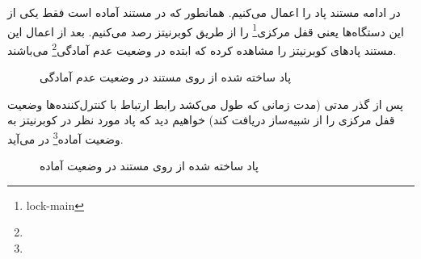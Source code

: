 {\begin{figure}[H]
        \label{fig:dash_devices}
    \end{figure}
    در ادامه مستند پاد را اعمال می‌کنیم. همانطور که در مستند آماده است فقط یکی از این دستگاه‌ها یعنی قفل مرکزی\footnote{lock-main} را از طریق کوبرنیتز رصد می‌کنیم. بعد از اعمال این مستند پاد‌های کوبرنیتز را مشاهده‌ کرده که ابتده در وضعیت عدم آمادگی\footnote{} می‌باشند.
    \begin{figure}[H]
        \caption{پاد ساخته شده از روی مستند در وضعیت عدم آمادگی}
        \label{fig:dash_pod_lock_main_not_ready}
    \end{figure}
    پس از گذر مدتی (مدت زمانی که طول می‌کشد رابط ارتباط با کنترل‌کننده‌ها وضعیت قفل مرکزی را از شبیه‌ساز دریافت کند) خواهیم دید که پاد مورد نظر در کوبرنیتز به وضعیت آماده\footnote{} در می‌آید.
    \begin{figure}[H]
        \caption{پاد ساخته شده از روی مستند در وضعیت آماده}
        \label{fig:dash_pod_lock_main_ready}
    \end{figure}

}
